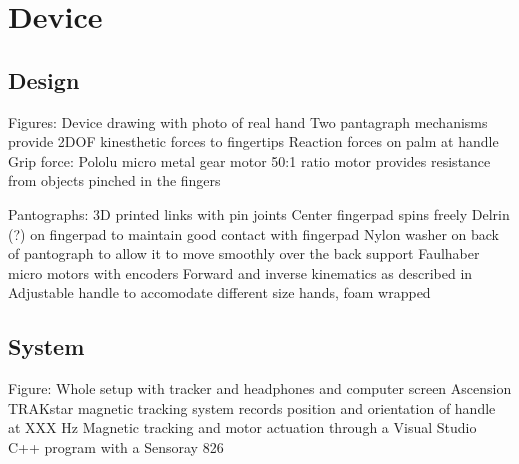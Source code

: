 \section{Device}

\subsection{Design}
\begin{outline}
\1 Figures: Device drawing with photo of real hand
\1 Two pantagraph mechanisms provide 2DOF kinesthetic forces to fingertips
\1 Reaction forces on palm at handle
\1 Grip force:
	\2 Pololu micro metal gear motor 50:1 ratio 
	\2 motor provides resistance from objects pinched in the fingers

\1 Pantographs: 
	\2 3D printed links with pin joints
	\2 Center fingerpad spins freely 
	\2 Delrin (?) on fingerpad to maintain good contact with fingerpad
	\2 Nylon washer on back of pantograph to allow it to move smoothly over the back support
	\2 Faulhaber micro motors with encoders
	\2 Forward and inverse kinematics as described in \cite{Campion2005}
\1 Adjustable handle to accomodate different size hands, foam wrapped


\end{outline}

\subsection{System}
\begin{outline}
\1 Figure: Whole setup with tracker and headphones and computer screen
\1 Ascension TRAKstar magnetic tracking system records position and orientation of handle at XXX Hz
\1 Magnetic tracking and motor actuation through a Visual Studio C++ program with a Sensoray 826 
\end{outline}
